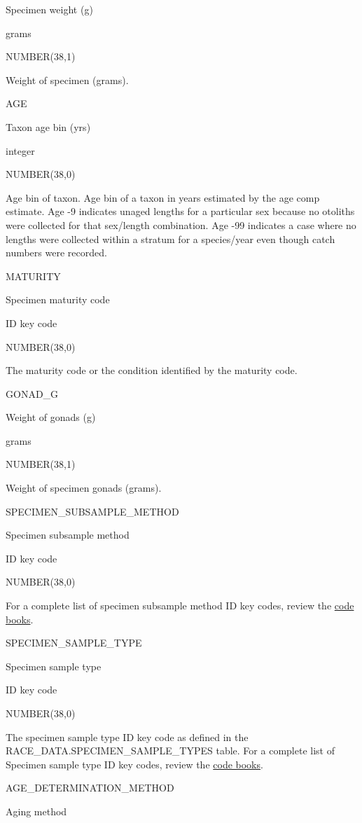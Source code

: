 \documentclass[
  letterpaper,
  oneside,
  open=any]{scrbook}
\begin{document}
Specimen weight (g)

grams

NUMBER(38,1)

Weight of specimen (grams).

AGE

Taxon age bin (yrs)

integer

NUMBER(38,0)

Age bin of taxon. Age bin of a taxon in years estimated by the age comp
estimate. Age -9 indicates unaged lengths for a particular sex because
no otoliths were collected for that sex/length combination. Age -99
indicates a case where no lengths were collected within a stratum for a
species/year even though catch numbers were recorded.

MATURITY

Specimen maturity code

ID key code

NUMBER(38,0)

The maturity code or the condition identified by the maturity code.

GONAD\_G

Weight of gonads (g)

grams

NUMBER(38,1)

Weight of specimen gonads (grams).

SPECIMEN\_SUBSAMPLE\_METHOD

Specimen subsample method

ID key code

NUMBER(38,0)

For a complete list of specimen subsample method ID key codes, review
the
\href{https://www.fisheries.noaa.gov/resource/document/groundfish-survey-species-code-manual-and-data-codes-manual}{code
books}.

SPECIMEN\_SAMPLE\_TYPE

Specimen sample type

ID key code

NUMBER(38,0)

The specimen sample type ID key code as defined in the
RACE\_DATA.SPECIMEN\_SAMPLE\_TYPES table. For a complete list of
Specimen sample type ID key codes, review the
\href{https://www.fisheries.noaa.gov/resource/document/groundfish-survey-species-code-manual-and-data-codes-manual}{code
books}.

AGE\_DETERMINATION\_METHOD

Aging method
\end{document}
